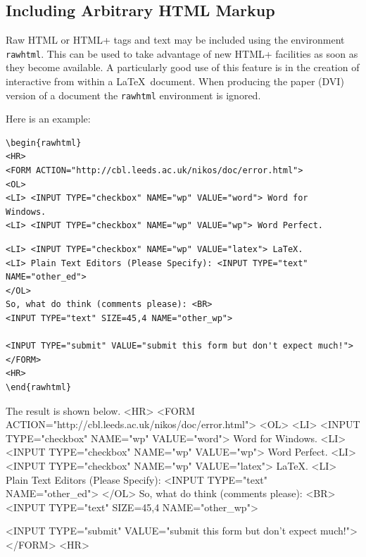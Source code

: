 \documentclass[dvips]{article}
\begin{document}
\subsection{Including Arbitrary HTML Markup}
Raw HTML or HTML+ tags and text may be included using the environment 
\texttt{rawhtml}. This can be used to take advantage
of new HTML+ facilities as soon as they become available.
 A particularly
good use of this feature is in the creation of interactive
from within a \LaTeX\  document. When producing the paper (DVI) version
of a document the \texttt{rawhtml} environment is ignored.

Here is an example: 
\begin{small}
\begin{verbatim}
\begin{rawhtml}
<HR>
<FORM ACTION="http://cbl.leeds.ac.uk/nikos/doc/error.html">
<OL>
<LI> <INPUT TYPE="checkbox" NAME="wp" VALUE="word"> Word for
Windows.
<LI> <INPUT TYPE="checkbox" NAME="wp" VALUE="wp"> Word Perfect.
\end{verbatim}
\begin{verbatim}
<LI> <INPUT TYPE="checkbox" NAME="wp" VALUE="latex"> LaTeX.
<LI> Plain Text Editors (Please Specify): <INPUT TYPE="text" NAME="other_ed">
</OL>
So, what do think (comments please): <BR>
<INPUT TYPE="text" SIZE=45,4 NAME="other_wp">

<INPUT TYPE="submit" VALUE="submit this form but don't expect much!">
</FORM>
<HR>
\end{rawhtml}
\end{verbatim}
\end{small}
\begin{rawhtml}
The result is shown below. 
<HR>
<FORM ACTION="http://cbl.leeds.ac.uk/nikos/doc/error.html">
<OL>
<LI> <INPUT TYPE="checkbox" NAME="wp" VALUE="word"> Word for
Windows.
<LI> <INPUT TYPE="checkbox" NAME="wp" VALUE="wp"> Word Perfect.
<LI> <INPUT TYPE="checkbox" NAME="wp" VALUE="latex"> LaTeX.
<LI> Plain Text Editors (Please Specify): <INPUT TYPE="text" NAME="other_ed">
</OL>
So, what do think (comments please): <BR>
<INPUT TYPE="text" SIZE=45,4 NAME="other_wp">

<INPUT TYPE="submit" VALUE="submit this form but don't expect much!">
</FORM>
<HR>
\end{rawhtml}
\end{document}

